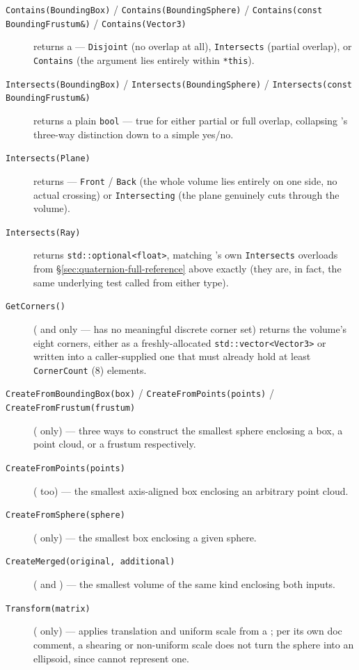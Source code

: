 \begin{description}
\item[\texttt{Contains(BoundingBox)} / \texttt{Contains(BoundingSphere)} /
  \texttt{Contains(const BoundingFrustum\&)} / \texttt{Contains(Vector3)}] returns a
   --- \texttt{Disjoint} (no overlap at all), \texttt{Intersects}
  (partial overlap), or \texttt{Contains} (the argument lies entirely within \texttt{*this}).
\item[\texttt{Intersects(BoundingBox)} / \texttt{Intersects(BoundingSphere)} /
  \texttt{Intersects(const BoundingFrustum\&)}] returns a plain \texttt{bool} --- true for
  either partial or full overlap, collapsing 's three-way distinction
  down to a simple yes/no.
\item[\texttt{Intersects(Plane)}] returns  ---
  \texttt{Front} / \texttt{Back} (the whole volume lies entirely on one side, no actual crossing)
  or \texttt{Intersecting} (the plane genuinely cuts through the volume).
\item[\texttt{Intersects(Ray)}] returns \texttt{std::optional<float>}, matching 's
  own \texttt{Intersects} overloads from \S\ref{sec:quaternion-full-reference} above exactly
  (they are, in fact, the same underlying test called from either type).
\item[\texttt{GetCorners()}] ( and  only ---
   has no meaningful discrete corner set) returns the volume's eight
  corners, either as a freshly-allocated \texttt{std::vector<Vector3>} or written into a
  caller-supplied one that must already hold at least \texttt{CornerCount} (8) elements.
\item[\texttt{CreateFromBoundingBox(box)} / \texttt{CreateFromPoints(points)} /
  \texttt{CreateFromFrustum(frustum)}] ( only) --- three ways to
  construct the smallest sphere enclosing a box, a point cloud, or a frustum respectively.
\item[\texttt{CreateFromPoints(points)}] ( too) --- the smallest
  axis-aligned box enclosing an arbitrary point cloud.
\item[\texttt{CreateFromSphere(sphere)}] ( only) --- the smallest box
  enclosing a given sphere.
\item[\texttt{CreateMerged(original, additional)}] ( and
  ) --- the smallest volume of the same kind enclosing both inputs.
\item[\texttt{Transform(matrix)}] ( only) --- applies translation and
  uniform scale from a ; per its own doc comment, a shearing or non-uniform
  scale does not turn the sphere into an ellipsoid, since  cannot
  represent one.
\end{description}

